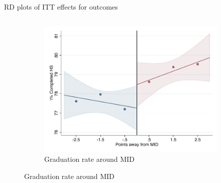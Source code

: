 \documentclass[notes,11pt, aspectratio=169]{beamer}
\begin{document}
\begin{frame}[label=ITT_rd_plot_IPN,fragile]{RD plots of ITT effects for outcomes}
{\begin{figure}
\begin{columns}[T]
\begin{column}{.5\textwidth}
    {\begin{subfigure}{\textwidth}
        \centering
        \caption{Graduation rate around MID}
        \includegraphics[width=\textwidth]{04_Figures/rd_plot_mid_bachillerato_mas_IPN3.pdf}
    \end{subfigure}}
\end{column}
\end{columns}

\label{fig:ITT_rd_plot_IPN}    
\end{figure}}

\end{frame}
\end{document}
